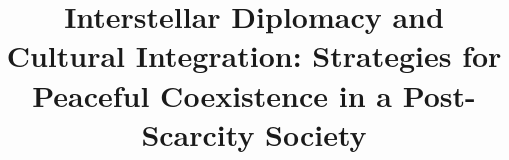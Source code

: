 

\def\titlemain{Interstellar Diplomacy and Cultural Integration: Strategies for Peaceful Coexistence in a Post-Scarcity Society}
\def\titlesub{}
\title{\titlemain}

\def\authorforename{Diziet}
\def\authorsurname{Sma}
\def\author{\authorforename\ \authorsurname}

\def\faculty{Special Circumstances}
\def\institution{GCU Arbitrary}
\def\institutionlogo{images/examples/cc-zero.png}

\makeatletter
\let\inserttitle\@title
\let\insertauthor\@author
\let\insertdate\@date
\makeatother

\setlength{\parskip}{4mm}

\newcommand{\exmpl}{Some Example Text\xspace}



